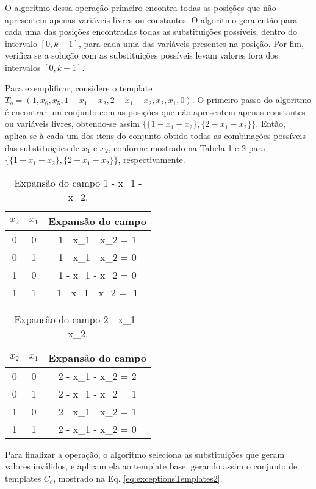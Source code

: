 O algoritmo dessa operação primeiro encontra todas as posições que não apresentem apenas variáveis livres ou constantes. O algoritmo gera então para cada uma das posições encontradas todas as substituições possíveis, dentro do intervalo $[0,k-1]$, para cada uma das variáveis presentes na posição. Por fim, verifica se a solução com as substituições possíveis levam valores fora dos intervalos $[0,k-1]$.

Para exemplificar, considere o template $T_{o} = (1, x_6, x_5, 1 - x_1 - x_2, 2 - x_1 - x_2, x_2, x_1, 0)$. O primeiro passo do algoritmo é encontrar um conjunto com as posições que não apresentem apenas constantes ou variáveis livres, obtendo-se assim $\{\{1 - x_1 - x_2\}, \{2 - x_1 - x_2\}\}$. Então, aplica-se à cada um dos itens do conjunto obtido todas as combinações possíveis das substituições de $x_1$ e $x_2$, conforme mostrado na Tabela \ref{tab:exceptionProcessA} e \ref{tab:exceptionProcessB} para $\{\{1 - x_1 - x_2\}, \{2 - x_1 - x_2\}\}$, respectivamente.
\begin{table}[h!]
\centering
\caption{Expansão do campo 1 - x_1 - x_2.}
	\begin{tabular}{ccc}
    \toprule
	$x_2$ & $x_1$ & Expansão do campo \\
    \midrule
	0	&	0	&	1 - x_1 - x_2 = 1	\\
	0	&	1	&	1 - x_1 - x_2 = 0	\\
	1	&	0	&	1 - x_1 - x_2 = 0	\\
	1	&	1	&	1 - x_1 - x_2 = -1	\\
    \bottomrule
	\end{tabular}
\label{tab:exceptionProcessA}
\end{table} 

\begin{table}[h!]
\centering
\caption{Expansão do campo 2 - x_1 - x_2.}
	\begin{tabular}{ccc}
    \toprule
	$x_2$ & $x_1$ & Expansão do campo \\
    \midrule
	0	&	0	&	2 - x_1 - x_2 = 2	\\
	0	&	1	&	2 - x_1 - x_2 = 1	\\
	1	&	0	&	2 - x_1 - x_2 = 1	\\
	1	&	1	&	2 - x_1 - x_2 = 0	\\
    \bottomrule
	\end{tabular}
\label{tab:exceptionProcessB}
\end{table}

Para finalizar a operação, o algoritmo seleciona as substituições que geram valores inválidos, e aplicam ela ao template base, gerando assim o conjunto de templates $C_e$, mostrado na  Eq. \ref{eq:exceptionsTemplates2}.

